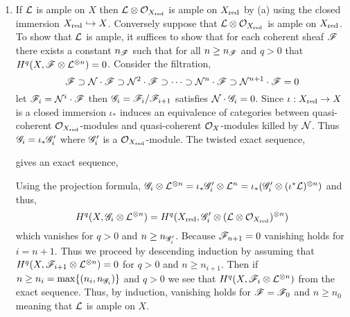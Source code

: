 \documentclass[12pt]{article}
\begin{document}
\begin{enumerate}
\item If $\mathcal{L}$ is ample on $X$ then $\mathcal{L} \otimes \mathcal{O}_{X_{\mathrm{red}}}$ is ample on $X_{\mathrm{red}}$ by (a) using the closed immersion $X_{\mathrm{red}} \hookrightarrow X$. Conversely suppose that $\mathcal{L} \otimes \mathcal{O}_{X_{\mathrm{red}}}$ is ample on $X_{\mathrm{red}}$. To show that $\mathcal{L}$ is ample, it suffices to show that for each coherent sheaf $\mathscr{F}$ there exists a constant $n_{\mathscr{F}}$ such that for all $n \ge n_{\mathscr{F}}$ and $q > 0$ that $H^q(X, \mathscr{F} \otimes \mathcal{L}^{\otimes n}) = 0$. Consider the filtration,
\[ \mathscr{F} \supset \mathcal{N} \cdot \mathscr{F} \supset \mathcal{N}^2 \cdot \mathscr{F} \supset \cdots \supset \mathcal{N}^n \cdot \mathscr{F} \supset \mathcal{N}^{n+1} \cdot \mathscr{F} = 0 \]
let $\mathscr{F}_i = \mathcal{N}^i \cdot \mathscr{F}$ then $\mathscr{G}_i = \mathscr{F}_i / \mathscr{F}_{i+1}$ satisfies $\mathcal{N} \cdot \mathscr{G}_i = 0$. Since $\iota : X_{\mathrm{red}} \to X$ is a closed immersion $\iota_*$ induces an equivalence of categories between quasi-coherent $\mathcal{O}_{X_{\mathrm{red}}}$-modules and quasi-coherent $\mathcal{O}_{X}$-modules killed by $\mathcal{N}$. Thus $\mathscr{G}_i = \iota_* \mathscr{G}_i'$ where $\mathscr{G}_i'$ is a $\mathcal{O}_{X_{\mathrm{red}}}$-module. The twisted exact sequence,
\begin{center}
\end{center}
gives an exact sequence,
\begin{center}
\end{center}
Using the projection formula, $\mathscr{G}_i \otimes \mathcal{L}^{\otimes n} = \iota_* \mathscr{G}_i' \otimes \mathcal{L}^n = \iota_* (\mathscr{G}_i' \otimes (\iota^* \mathcal{L})^{\otimes n})$ and thus,
\[ H^q(X, \mathscr{G}_i \otimes \mathcal{L}^{\otimes n}) = H^q(X_{\mathrm{red}}, \mathscr{G}_i' \otimes (\mathcal{L} \otimes \mathcal{O}_{X_{\mathrm{red}}})^{\otimes n}) \]
which vanishes for $q > 0$ and $n \ge n_{\mathscr{G}_i'}$. Because $\mathscr{F}_{n+1} = 0$ vanishing holds for $i = n+1$. Thus we proceed by descending induction by assuming that $H^q(X, \mathscr{F}_{i+1} \otimes \mathcal{L}^{\otimes n}) = 0$ for $q > 0$ and $n \ge n_{i+1}$. Then if $n \ge n_i = \max\{(n_i, n_{\mathscr{G}_i})\}$ and $q > 0$ we see that $H^q(X, \mathscr{F}_i \otimes \mathcal{L}^{\otimes n})$ from the exact sequence. Thus, by induction, vanishing holds for $\mathscr{F} = \mathscr{F}_0$ and $n \ge n_0$ meaning that $\mathcal{L}$ is ample on $X$.


\end{enumerate}
\end{document}
